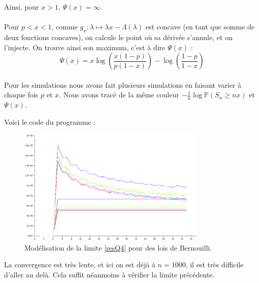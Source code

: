 \documentclass[12pt]{article}
\renewcommand{\P}{\mathbb{P}}
\begin{document}
			Ainsi, pour $x > 1$, $\Psi(x) = \infty$.
			
			\paragraph{} Pour $p < x < 1$, comme $g_x : \lambda \mapsto \lambda x - \Lambda( \lambda )$ est concave (en tant que somme de deux fonctions concaves), on calcule le point où sa dérivée s'annule, et on l'injecte. On trouve ainsi son maximum, c'est à dire $\Psi(x)$ :
			\begin{equation}
			\boxed{\Psi(x) = x \log\left(\frac{x (1-p)}{p (1-x)}\right)  - \log\left(\frac{1-p}{1-x}\right)} \label{resQ5}
			\end{equation}
			
			
			\paragraph{}Pour les simulations nous avons fait plusieurs simulations en faisant varier à chaque fois $p$ et $x$. Nous avons tracé de la même couleur $-\frac{1}{n} \log \P(S_n \geqslant nx)$ et $\Psi(x)$.
			
			Voici le code du programme :
			
			\begin{mdframed}[default]
				
			\end{mdframed}		
			
			
			\begin{figure}[H]
				\centering
				\caption{Modélisation de la limite \ref{resQ4} pour des lois de Bernouilli.}
				\includegraphics[width=0.8\textwidth]{../Scilab/Images/1_5.eps}
			\end{figure}
						
			La convergence est très lente, et ici on est déjà à $n = 1 000$, il est très difficile d'aller au delà. Cela suffit néanmoins à vérifier la limite précédente.
			
\end{document}
